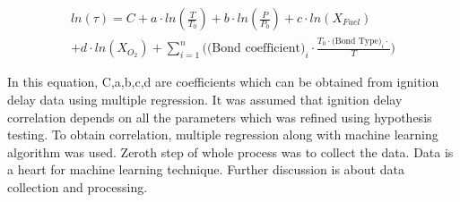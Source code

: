 \documentclass[preprint,12pt]{elsarticle}
\begin{document}
		
		\begin{multline}\label{eq:hypo_ignition}
		ln(\tau) = C + a \cdot ln(\frac{T}{T_0}) + b \cdot ln(\frac{P}{P_0})+ c \cdot ln(X_{Fuel}) \\
		+d \cdot ln(X_{O_2}) + \sum_{i=1}^{n} \Bigg({\text{(Bond coefficient)}_{i} \cdot \frac{T_0 \cdot {\text{(Bond Type)}_{i} \cdot }}{T}} \Bigg) 
		\end{multline}
		
		
		In this equation, C,a,b,c,d are coefficients which can be obtained from ignition delay data using multiple regression. It was assumed that ignition delay correlation depends on all the parameters which was refined using hypothesis testing. To obtain correlation, multiple regression along with machine learning algorithm was used. Zeroth step of whole process was to collect the data. Data is a heart for  machine learning technique. Further discussion is about data collection and processing.
		
		
		
\end{document}
